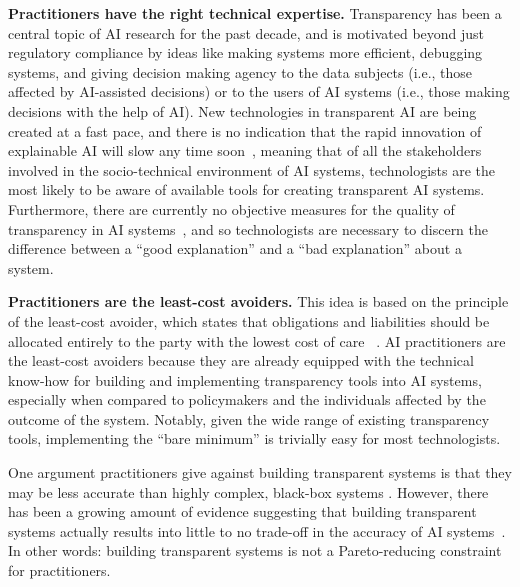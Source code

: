 \documentclass[sigconf, nonacm]{acmart}
\begin{document}
{\bf Practitioners have the right technical expertise.} Transparency has been a central topic of AI research for the past decade, and is motivated beyond just regulatory compliance by ideas like making systems more efficient, debugging systems, and giving decision making agency to the data subjects (i.e., those affected by AI-assisted decisions) or to the users of AI systems (i.e., those making decisions with the help of AI). New technologies in transparent AI are being created at a fast pace, and there is no indication that the rapid innovation of explainable AI will slow any time soon~\cite{DBLP:conf/nips/LundbergL17, ribeiro2016should, datta2016algorithmic, DBLP:journals/corr/abs-2004-00668, DBLP:journals/corr/abs-2004-00668}, meaning that of all the stakeholders involved in the socio-technical environment of AI systems, technologists are the most likely to be aware of available tools for creating transparent AI systems. Furthermore, there are currently no objective measures for the quality of transparency in AI systems~\cite{gunning2019xai, abdul2020cogam, yang2019study, holzinger2020measuring, lu2019good}, and so technologists are necessary to discern the difference between a ``good explanation'' and a ``bad explanation'' about a system.

{\bf Practitioners are the least-cost avoiders.} This idea is based on the principle of the least-cost avoider, which states that obligations and liabilities should be allocated entirely to the party with the lowest cost of care ~\cite{stoyanovich2016revealing}. AI practitioners are the least-cost avoiders because they are already equipped with the technical know-how for building and implementing transparency tools into AI systems, especially when compared to policymakers and the individuals affected by the outcome of the system. Notably, given the wide range of existing transparency tools, implementing the ``bare minimum'' is trivially easy for most technologists.

One argument practitioners give against building transparent systems is that they may be less accurate than highly complex, black-box systems \cite{huysmans2006using}. However, there has been a growing amount of evidence suggesting that building transparent systems actually results into little to no trade-off in the accuracy of AI systems~\cite{rudin2019stop, bell2019proactive, stiglic2015comprehensible, de2018predicting}. In other words: building transparent systems is not a Pareto-reducing constraint for practitioners.
\end{document}
